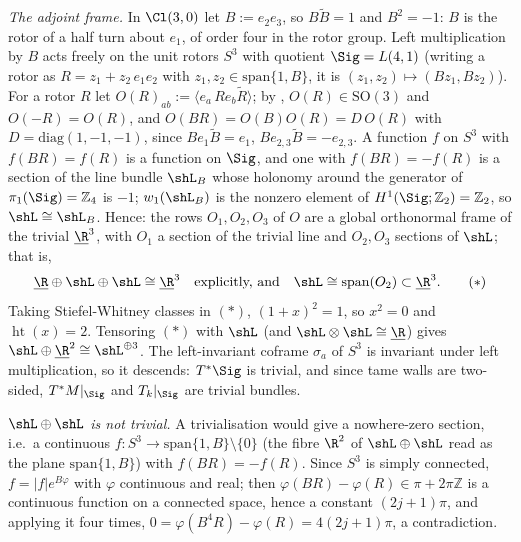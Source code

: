 \emph{The adjoint frame.} In $\Cl(3,0)$ let $B := e_2 e_3$, so $B\tilde B = 1$ and $B^{2} = -1$: $B$ is the rotor of a half turn about $e_1$, of order four in the rotor group. Left multiplication by $B$ acts freely on the unit rotors $S^{3}$ with quotient $\Sig = L(4,1)$ (writing a rotor as $R = z_1 + z_2\,e_1e_2$ with $z_1, z_2 \in \mathrm{span}\{1, B\}$, it is $(z_1, z_2) \mapsto (Bz_1, Bz_2)$). For a rotor $R$ let $O(R)_{ab} := \langle e_a\, R e_b \tilde R\rangle$; by , $O(R) \in \mathrm{SO}(3)$ and $O(-R) = O(R)$, and $O(BR) = O(B)O(R) = D\,O(R)$ with $D = \mathrm{diag}(1,-1,-1)$, since $B e_1 \tilde B = e_1$, $B e_{2,3} \tilde B = -e_{2,3}$. A function $f$ on $S^{3}$ with $f(BR) = f(R)$ is a function on $\Sig$, and one with $f(BR) = -f(R)$ is a section of the line bundle $\shL_B$ whose holonomy around the generator of $\pi_1(\Sig) = \mathbb{Z}_4$ is $-1$; $w_1(\shL_B)$ is the nonzero element of $H^{1}(\Sig;\mathbb{Z}_2) = \mathbb{Z}_2$, so $\shL \cong \shL_B$. Hence: the rows $O_1, O_2, O_3$ of $O$ are a global orthonormal frame of the trivial $\underline{\R}^{3}$, with $O_1$ a section of the trivial line and $O_2, O_3$ sections of $\shL$; that is,
\[
\underline{\R} \oplus \shL \oplus \shL \cong \underline{\R}^{3} \quad\text{explicitly, and}\quad \shL \cong \operatorname{span}(O_2) \subset \underline{\R}^{3}. \tag{$*$}
\]
Taking Stiefel-Whitney classes in $(*)$, $(1+x)^{2} = 1$, so $x^{2} = 0$ and $\operatorname{ht}(x) = 2$. Tensoring $(*)$ with $\shL$ (and $\shL \otimes \shL \cong \underline\R$) gives $\shL \oplus \underline{\R}^{2} \cong \shL^{\oplus 3}$. The left-invariant coframe $\sigma_a$ of $S^{3}$ is invariant under left multiplication, so it descends: $T^*\Sig$ is trivial, and since tame walls are two-sided, $T^*M|_\Sig$ and $T_k|_\Sig$ are trivial bundles.

\emph{$\shL \oplus \shL$ is not trivial.} A trivialisation would give a nowhere-zero section, i.e.\ a continuous $f : S^{3} \to \mathrm{span}\{1, B\}\setminus\{0\}$ (the fibre $\R^{2}$ of $\shL \oplus \shL$ read as the plane $\mathrm{span}\{1, B\}$) with $f(BR) = -f(R)$. Since $S^{3}$ is simply connected, $f = |f| e^{B\varphi}$ with $\varphi$ continuous and real; then $\varphi(BR) - \varphi(R) \in \pi + 2\pi\mathbb{Z}$ is a continuous function on a connected space, hence a constant $(2j+1)\pi$, and applying it four times, $0 = \varphi(B^{4}R) - \varphi(R) = 4(2j+1)\pi$, a contradiction.

